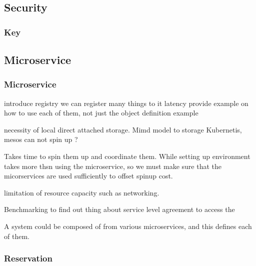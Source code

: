 \documentclass[10pt]{article}
\begin{document}
\subsection{Security}

\subsubsection{Key}


\subsection{Microservice}

\subsubsection{Microservice}

 
introduce registry we can register many things to it latency provide
example on how to use each of them, not just the object definition
example
 
necessity of local direct attached storage. 
Mimd model to storage  
Kubernetis, mesos can not spin up ?  

Takes time to spin them up and coordinate them. While setting up
environment takes more thsn using the microservice, so we must make
sure that the micorservices are used sufficiently to offset spinup
cost.
 
limitation of resource capacity such as networking. 
 
Benchmarking to find out thing about service level agreement to access
the 


A system could be composed of from various microservices, and this defines
each of them.



\subsubsection{Reservation}
\end{document}
